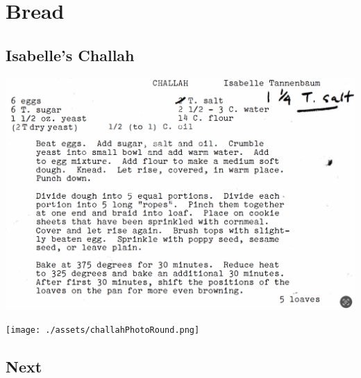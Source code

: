 \documentclass[
  letterpaper,
  DIV=11,
  numbers=noendperiod]{scrreprt}
\begin{document}
\hypertarget{bread}{%
\chapter*{Bread}\label{bread}}


\hypertarget{isabelles-challah}{%
\section*{Isabelle's Challah}\label{isabelles-challah}}


\includegraphics{./assets/challah_recipe.png}

\texttt{[image: ./assets/challahPhotoRound.png]}

\hypertarget{next-1}{%
\section*{Next}\label{next-1}}

\end{document}
